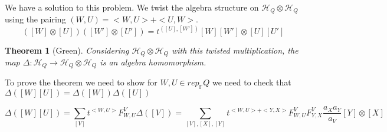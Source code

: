 \documentclass{book}
\newtheorem{theorem}{Theorem}[section]
\begin{document}
We have a solution to this problem. We twist the algebra structure on $\mathcal{H}_Q \otimes \mathcal{H}_Q$ using the pairing $(W,U)=<W,U>+<U,W>$. 
$$([W]\otimes [U])([W']\otimes[U'])=t^{([U],[W'])}[W][W'] \otimes [U][U']$$

\begin{theorem}[Green]
Considering $\mathcal{H}_Q \otimes \mathcal{H}_Q$ with this twisted multiplication, the map $\Delta: \mathcal{H}_Q  \rightarrow \mathcal{H}_Q \otimes \mathcal{H}_Q$ is an algebra homomorphism. 
\end{theorem}


To prove the theorem we need to show for $W,U \in rep_{\mathbb{F}}Q$ we need to check that $\Delta ([W][U])=\Delta ([W])\Delta ([U])$ 

$$\Delta ([W][U]) =  \sum_{[V]} t^{<W,U>} F^V_{W,U} \Delta( [V] ) =  \sum_{[V],[X],[Y]} t^{<W,U>+<Y,X>} F^V_{W,U}  F^V_{Y,X} \frac{a_X a_Y}{a_V} [Y] \otimes [X]$$
\end{document}
